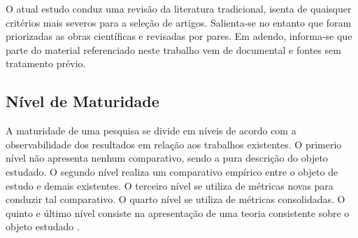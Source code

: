 
O atual estudo conduz uma revisão da literatura tradicional, isenta de quaisquer critérios mais severos para a seleção de artigos. Salienta-se no entanto que foram priorizadas as obras científicas e revisadas por pares. Em adendo, informa-se que parte do material referenciado neste trabalho vem de documental e fontes sem tratamento prévio. 









\subsection{Nível de Maturidade}\label{sub:maturidade}

A maturidade de uma pesquisa se divide em níveis de acordo com a observabilidade dos resultados em relação aos trabalhos existentes. O primerio nível não apresenta nenhum comparativo, sendo a pura descrição do objeto estudado. O segundo nível realiza um comparativo empírico entre o objeto de estudo e demais existentes. O terceiro nível se utiliza de métricas novas para conduzir tal comparativo. O quarto nível se utiliza de métricas consolidadas. O quinto e último nível consiste na apresentação de uma teoria consistente sobre o objeto estudado \cite{wazlawick2014metodologia}.%

